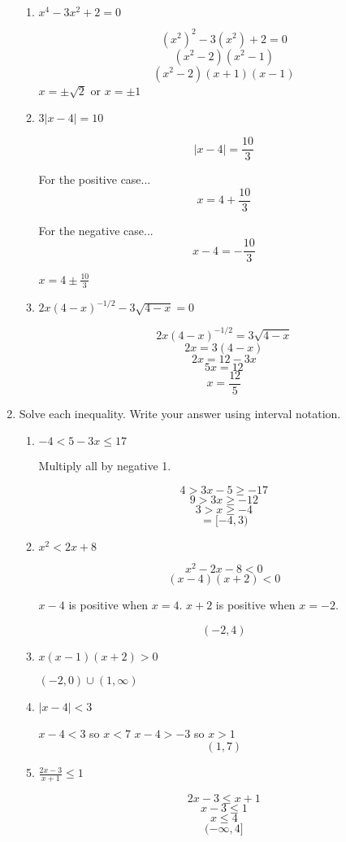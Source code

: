 \documentclass{article}
\begin{document}
\begin{enumerate}
\begin{enumerate}
		\item $x^4 - 3x^2 + 2 = 0$

			$$(x^2)^2 - 3(x^2) + 2 = 0$$
			$$(x^2-2)(x^2-1)$$
			$$(x^2-2)(x+1)(x-1)$$
			$x = \pm \sqrt{2}$ or $x = \pm 1$

		\item $3|x - 4| = 10$

			$$|x - 4| = \frac{10}{3}$$
		
		For the positive case...
			$$x = 4 + \frac{10}{3}$$

		For the negative case...
			$$x - 4 = -\frac{10}{3}$$

			$x = 4 \pm \frac{10}{3}$

		\item $2x(4-x)^{-1/2} - 3\sqrt{4-x} = 0$

			$$2x(4-x)^{-1/2} = 3\sqrt{4-x}$$
			$$2x = 3(4-x)$$
			$$2x = 12 - 3x$$
			$$5x = 12$$
			$$x = \frac{12}{5}$$
		
	\end{enumerate}
	\item Solve each inequality. Write your answer using interval notation.
	\begin{enumerate}

		\item $-4 < 5 - 3x \leq 17$

		Multiply all by negative 1.

		$$4 > 3x - 5 \geq -17$$
		$$9 > 3x \geq -12$$
		$$3 > x \geq -4$$
		$$ = [-4, 3)$$

		\item $x^2 < 2x +8$

			$$ x^2 -2x - 8 < 0$$
			$$ (x-4)(x+2) < 0$$

			$x-4$ is positive when $x = 4$. $x + 2$ is positive when $x = -2$.

			$$(-2, 4)$$

		\item $x(x - 1)(x+2) > 0$

			$(-2, 0)\cup (1, \infty)$

		\item $|x - 4| < 3$

			$x - 4 < 3$ so $x <7$
			$x - 4 > -3$ so $x > 1$
			$$(1,7)$$

		\item $\frac{2x-3}{x+1} \leq 1$

			$$2x-3 \leq x+1$$
			$$x - 3 \leq 1$$
			$$x \leq 4$$
			$$(-\infty, 4]$$

	\end{enumerate}


\end{enumerate}
\end{document}
